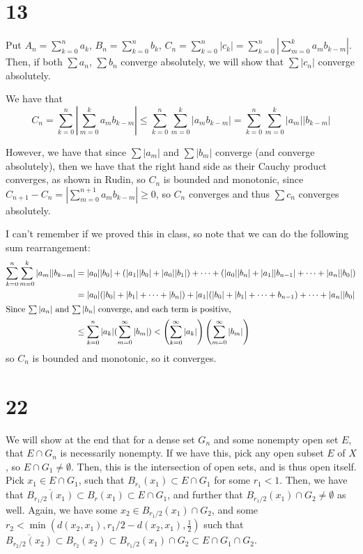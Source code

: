 \documentclass[12pt,letterpaper]{article}
\theoremstyle{definition}
\begin{document}
\section*{13}

Put $A_{n} = \sum_{k=0}^{n}a_{k}$, $B_{n} = \sum_{k=0}^{n}b_{k}$, $C_{n} = \sum_{k=0}^{n}|c_{k}| = \sum_{k=0}^{n}\left|\sum_{m=0}^{k}a_{m}b_{k-m}\right|$. Then, if both $\sum a_{n}$, $\sum b_{n}$ converge absolutely, we will show that $\sum |c_{n}|$ converge absolutely.

We have that
\[
  C_{n} = \sum_{k=0}^{n}\left|\sum_{m=0}^{k}a_{m}b_{k-m}\right| \leq \sum_{k=0}^{n}\sum_{m=0}^{k}|a_{m}b_{k-m}| =  \sum_{k=0}^{n}\sum_{m=0}^{k}|a_{m}||b_{k-m}|
\]

However, we have that since $\sum |a_{m}|$ and $\sum |b_{m}|$ converge (and converge absolutely), then we have that the right hand side as their Cauchy product converges, as shown in Rudin, so $C_{n}$ is bounded and monotonic, since $C_{n+1} - C_{n} = \left|\sum_{m=0}^{n+1}a_{m}b_{k-m}\right| \geq 0$, so $C_{n}$ converges and thus $\sum c_{n}$ converges absolutely.

I can't remember if we proved this in class, so note that we can do the following sum rearrangement:
\begin{align*}
  \sum_{k=0}^{n}\sum_{m=0}^{k}|a_{m}||b_{k-m}| &= |a_{0}||b_{0}| + (|a_{1}||b_{0}| + |a_{0}||b_{1}|) + \dots + (|a_{0}||b_{n}| + |a_{1}||b_{n-1}| + \dots + |a_{n}||b_{0}|) \\
                                               &= |a_{0}|(|b_{0}| + |b_{1}| + \dots + |b_{n}|) + |a_{1}|(|b_{0}| + |b_{1}| + \dots + b_{n-1}) + \dots + |a_{n}||b_{0}| \\
  \intertext{Since $\sum |a_{n}|$ and $\sum |b_{n}|$ converge, and each term is positive,}
                                               &\leq \sum_{k=0}^{n}|a_{k}|(\sum_{m=0}^{\infty}|b_{m}|) < \left(\sum_{k=0}^{\infty}|a_{k}|\right)\left(\sum_{m=0}^{\infty}|b_{m}|\right)
\end{align*}
so $C_{n}$ is bounded and monotonic, so it converges.

\section*{22}

We will show at the end that for a dense set $G_{n}$ and some nonempty open set $E$, that $E \cap G_{n}$ is necessarily nonempty. If we have this, pick any open subset $E$ of $X$, so $E \cap G_{1} \neq \emptyset$. Then, this is the intersection of open sets, and is thus open itself. Pick $x_{1} \in E \cap G_{1}$, such that $B_{r_{1}}(x_{1}) \subset E \cap G_{1}$ for some $r_{1} < 1$. Then, we have that $\overline{B_{r_{1}/2}(x_{1})} \subset B_{r}(x_{1}) \subset E \cap G_{1}$, and further that $B_{r_{1}/2}(x_{1}) \cap G_{2} \neq \emptyset$ as well. Again, we have some $x_{2} \in B_{r_{1}/2}(x_{1}) \cap G_{2}$, and some $r_{2} < \min(d(x_{2},x_{1}), r_{1}/2 - d(x_{2},x_{1}), \frac{1}{2})$ such that $\overline{B_{r_{2}/2}(x_{2})} \subset B_{r_{2}}(x_{2}) \subset B_{r_{1}/2}(x_{1}) \cap G_{2} \subset E \cap G_{1} \cap G_{2}$.
\end{document}
